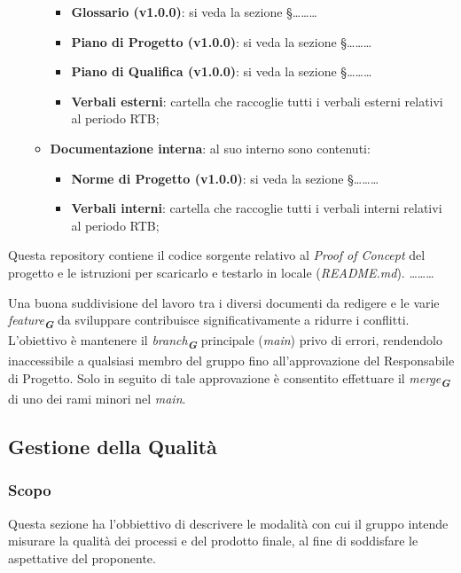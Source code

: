 \begin{itemize}
\begin{itemize}
\begin{itemize}
            \item \textbf{Glossario (v1.0.0)}: si veda la sezione \S\dots\dots\dots
            \item \textbf{Piano di Progetto (v1.0.0)}: si veda la sezione \S\dots\dots\dots
            \item \textbf{Piano di Qualifica (v1.0.0)}: si veda la sezione \S\dots\dots\dots
            \item \textbf{Verbali esterni}: cartella che raccoglie tutti i verbali esterni relativi al periodo RTB;
        \end{itemize}
        \item \textbf{Documentazione interna}: al suo interno sono contenuti:
        \begin{itemize}
            \item \textbf{Norme di Progetto (v1.0.0)}: si veda la sezione \S\dots\dots\dots
            \item \textbf{Verbali interni}: cartella che raccoglie tutti i verbali interni relativi al periodo RTB;
        \end{itemize}
    \end{itemize}
\end{itemize}

Questa repository contiene il codice sorgente relativo al \emph{Proof of Concept} del progetto e le
istruzioni per scaricarlo e testarlo in locale (\emph{README.md}). \dots\dots\dots

Una buona suddivisione del lavoro tra i diversi documenti da redigere e le varie \emph{feature}\textsubscript{\textit{\textbf{G}}}
da sviluppare contribuisce significativamente a ridurre i conflitti. L’obiettivo è mantenere 
il \emph{branch}\textsubscript{\textit{\textbf{G}}} principale (\emph{main}) privo di errori, rendendolo inaccessibile a qualsiasi membro 
del gruppo fino all’approvazione del Responsabile di Progetto. Solo in seguito di tale
approvazione è consentito effettuare il \emph{merge}\textsubscript{\textit{\textbf{G}}} di uno dei rami minori nel \emph{main}.


\subsection{Gestione della Qualità}
\label{sec:gestione della qualità}

\subsubsection{Scopo}
Questa sezione ha l'obbiettivo di descrivere le modalità con cui il gruppo intende misurare la qualità dei processi e del prodotto finale, al fine di soddisfare le aspettative del proponente.

